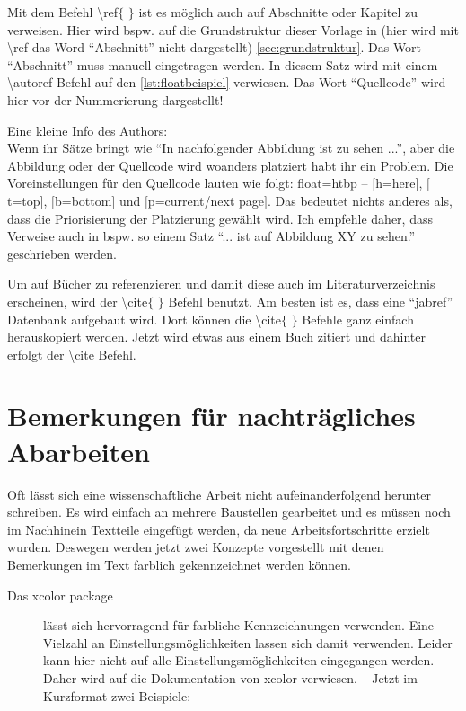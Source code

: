 	Mit dem Befehl \textbackslash ref$\{$ $\}$ ist es möglich auch auf Abschnitte oder Kapitel zu verweisen. Hier wird bspw. auf die Grundstruktur dieser Vorlage in (hier wird mit \textbackslash ref das Word \enquote{Abschnitt} nicht dargestellt) \ref{sec:grundstruktur}. Das Wort \enquote{Abschnitt} muss manuell eingetragen werden. In diesem Satz wird mit einem \textbackslash autoref Befehl auf den \autoref{lst:floatbeispiel} verwiesen. Das Wort \enquote{Quellcode} wird hier vor der Nummerierung dargestellt!
	
	Eine kleine Info des Authors: \\
	Wenn ihr Sätze bringt wie \enquote{In nachfolgender Abbildung ist zu sehen ...}, aber die Abbildung oder der Quellcode wird woanders platziert habt ihr ein Problem. Die Voreinstellungen für den Quellcode lauten wie folgt: float=htbp -- $[$h=here$]$, $[$t=top$]$, $[$b=bottom$]$ und $[$p=current/next page$]$. Das bedeutet nichts anderes als, dass die Priorisierung der Platzierung gewählt wird. Ich empfehle daher, dass Verweise auch in bspw. so einem Satz \enquote{... ist auf Abbildung XY zu sehen.} geschrieben werden.
	
	Um auf Bücher zu referenzieren und damit diese auch im Literaturverzeichnis erscheinen, wird der \textbackslash cite$\{$ $\}$ Befehl benutzt. Am besten ist es, dass eine \enquote{jabref} Datenbank aufgebaut wird. Dort können die \textbackslash cite$\{$ $\}$ Befehle ganz einfach herauskopiert werden. Jetzt wird etwas aus einem Buch zitiert und dahinter erfolgt der \textbackslash cite Befehl. \cite[S.~27~ff.]{Raschka2017}
	
	\section[Bemerkungen eintragen]{Bemerkungen für nachträgliches Abarbeiten}
		\label{sec:bemerkungen}
		Oft lässt sich eine wissenschaftliche Arbeit nicht aufeinanderfolgend herunter schreiben. Es wird einfach an mehrere Baustellen gearbeitet und es müssen noch im Nachhinein Textteile eingefügt werden, da neue Arbeitsfortschritte erzielt wurden. Deswegen werden jetzt zwei Konzepte vorgestellt mit denen Bemerkungen im Text farblich gekennzeichnet werden können.
	
	\begin{description}
\item[Das xcolor package] lässt sich hervorragend für farbliche Kennzeichnungen verwenden. Eine Vielzahl an Einstellungsmöglichkeiten lassen sich damit verwenden. Leider kann hier nicht auf alle Einstellungsmöglichkeiten eingegangen werden. Daher  wird auf die Dokumentation von xcolor verwiesen. -- Jetzt im Kurzformat zwei Beispiele:
	\end{description}
	
